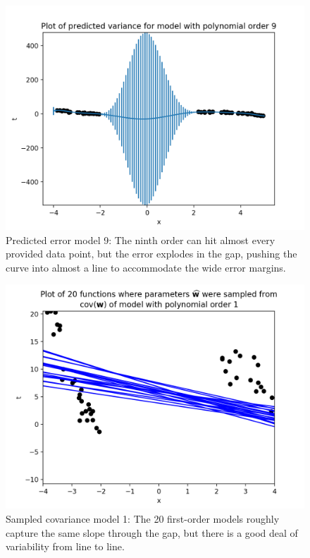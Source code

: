 \documentclass[10pt]{article}
\begin{document}
\begin{itemize}
\begin{figure}[H]
\centering
  \includegraphics[width=\linewidth]{error-9.png}
 \caption{Predicted error model 9: The ninth order can hit almost every provided data point, but the error explodes in the gap, pushing the curve into almost a line to accommodate the wide error margins.}
\label{label}
\end{figure}

\begin{figure}[H]
\centering
  \includegraphics[width=\linewidth]{sampled-fns-1.png}
 \caption{Sampled covariance model 1: The 20 first-order models roughly capture the same slope through the gap, but there is a good deal of variability from line to line.}
\label{label}
\end{figure}


\end{itemize}
\end{document}
